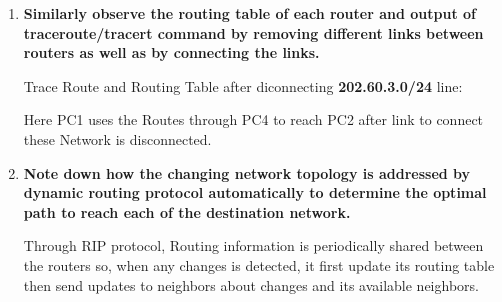 \documentclass[a4paper,11pt]{article}
\begin{document}
\begin{enumerate}
    \item \textbf{Similarly observe the routing table of each router and output of traceroute/tracert command
              by removing different links between routers as well as by connecting the links.}


          Trace Route and Routing Table after diconnecting \textbf{202.60.3.0/24} line:




          Here PC1 uses the Routes through PC4 to reach PC2 after link to connect these Network is disconnected.

    \item \textbf{Note down how the changing network topology is addressed by dynamic routing protocol
              automatically to determine the optimal path to reach each of the destination network.}

          Through RIP protocol, Routing information is periodically shared between the routers so, when any changes is detected, it first update its routing table then send updates to neighbors about changes and its available neighbors.






\end{enumerate}

\pagebreak

%

%

%

%
%
\end{document}
